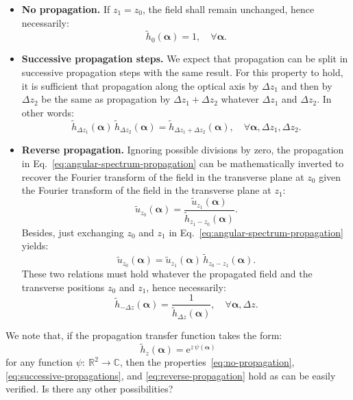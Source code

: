 \documentclass[a4paper]{article}
\newcommand{\oops}[1]{{\color{purple}#1}}
\newcommand{\V}[1]{\boldsymbol{#1}}
\newcommand*{\from}{{:}\:}
\newcommand*{\mathe}{\mathrm{e}}
\newcommand*{\FT}[1]{\widetilde{#1}}
\begin{document}
\begin{itemize}
\item \textbf{No propagation.} If $z_{1} = z_{0}$, the field shall remain
      unchanged, hence necessarily:
      \begin{equation}
        \label{eq:no-propagation}
        \FT{h}_{0}(\V{α}) = 1,\quad ∀\V{α}.
      \end{equation}

\item \textbf{Successive propagation steps.} We expect that propagation can be
      split in successive propagation steps with the same result. For this
      property to hold, it is sufficient that propagation along the optical axis by
      $Δz_{1}$ and then by $Δz_{2}$ be the same as propagation by
      $Δz_{1} + Δz_{2}$ whatever $Δz_{1}$ and $Δz_{2}$.
      In other words:
      \begin{equation}
        \label{eq:successive-propagations}
        \FT{h}_{Δz_{1}}(\V{α})\,
        \FT{h}_{Δz_{2}}(\V{α}) =
        \FT{h}_{Δz_{1} + Δz_{2}}(\V{α}),
        \quad ∀\V{α},Δz_{1}, Δz_{2}.
      \end{equation}

\item \textbf{Reverse propagation.} Ignoring possible divisions by zero, the
      propagation in Eq.~\eqref{eq:angular-spectrum-propagation} can be
      mathematically inverted to recover the Fourier transform of the field in
      the transverse plane at $z_{0}$ given the Fourier transform of the field
      in the transverse plane at $z_{1}$:
      \begin{displaymath}
        \FT{u}_{z_{0}}(\V{α})
        = \frac{\FT{u}_{z_{1}}(\V{α})}{\FT{h}_{z_{1} - z_{0}}(\V{α})}.
      \end{displaymath}
      Besides, just exchanging $z_{0}$ and $z_{1}$ in
      Eq.~\eqref{eq:angular-spectrum-propagation} yields:
      \begin{displaymath}
        \FT{u}_{z_{0}}(\V{α}) =
        \FT{u}_{z_{1}}(\V{α})\,\FT{h}_{z_{0} - z_{1}}(\V{α}).
      \end{displaymath}
      These two relations must hold whatever the propagated field and the
      transverse positions $z_{0}$ and $z_{1}$, hence necessarily:
      \begin{equation}
        \label{eq:reverse-propagation}
        \FT{h}_{-Δz}(\V{α})
        = \frac{1}{\FT{h}_{Δz}(\V{α})},\quad ∀\V{α},Δz.
      \end{equation}
\end{itemize}
We note that, if the propagation transfer function takes the form:
\begin{equation}
  \label{eq:exponential-form}
  \FT{h}_{z}(\V{α}) = \mathe^{z\,ψ(\V{α})}
\end{equation}
for any function $ψ \from ℝ^{2}\to ℂ$, then the
properties~\eqref{eq:no-propagation}, \eqref{eq:successive-propagations}, and
\eqref{eq:reverse-propagation} hold as can be easily verified. \oops{Is there
  any other possibilities?}
\end{document}
